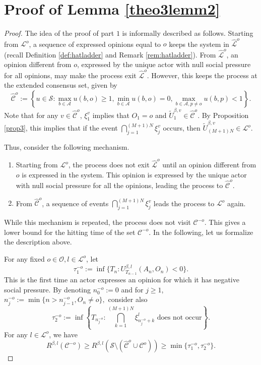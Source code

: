 \documentclass[11pt]{article}
\theoremstyle{definition}
\newcommand{\A}{\mathcal{A}}
\begin{document}
\section{Proof of Lemma \ref{theo3lemm2}}\label{appendixB}

\begin{proof} 
The idea of the proof of part $1$ is informally described as follows. Starting from $\mathcal{L}^o$, a sequence of expressed opinions equal to $o$ keeps the system in $\hat{\mathcal{L}}^o$ (recall Definition \ref{def:hatladder} and Remark \ref{rem:hatladder}). From $\hat{\mathcal{L}}^o$, an opinion different from $o$, expressed by the unique actor with null social pressure for all opinions, may make the process exit $\hat{\mathcal{L}}^o$. However, this keeps the process at the extended consensus set, given by
$$
\hat{\mathcal{C}}^{o}:=\left\{u\in\mathcal{S}: \max_{b\in \A}u(b,o)\geq 1, \min_{b\in \A}u(b,o)= 0,\max_{b\in \A, p\neq o}u(b,p)<1\right\}.
$$
Note that for any $v\in \hat{\mathcal{C}}^{o}$, $\xi_1^{v}$ implies that $O_1=o$ and $\tilde{U}_{1}^{\beta,v}\in \hat{\mathcal{C}}^{o}$. By Proposition \ref{prop3}, this implies that if the event $\bigcap^{(M+1)N}_{j=1}\xi_j^{v}$ occurs, then $\tilde{U}^{\beta,v}_{(M+1)N}\in\mathcal{L}^o$. 

Thus, consider the following mechanism.
\begin{enumerate}
    \item Starting from $\mathcal{L}^o$, the process does not exit $\hat{\mathcal{L}}^o$ until an opinion different from $o$ is expressed in the system. This opinion is expressed by the unique actor with null social pressure for all the opinions, leading the process to $\hat{\mathcal{C}}^{o}$.
    \item From $\hat{\mathcal{C}}^{o}$, a sequence of events $\bigcap^{(M+1)N}_{j=1}\xi_j^{v}$ leads the process to $\mathcal{L}^{o}$ again.
\end{enumerate}
While this mechanism is repeated, the process does not visit $\mathcal{C}^{-o}$. This gives a lower bound for the hitting time of the set $\mathcal{C}^{-o}$. In the following, let us formalize the description above.

For any fixed $o\in\mathcal{O},l \in\mathcal{L}^o$, let
    $$
        \tau^{-o}_1:=\inf\{T_n:U^{\beta,l}_{T_{n-1}}(A_n,O_n)<0\}.
    $$
    This is the first time an actor expresses an opinion for which it has negative social pressure. By denoting $n^{-o}_0:=0$ and for $j\geq1$, $n^{-o}_j:=\min\{n>n^{-o}_{j-1}, O_n\neq o\},$ consider also 
    $$
    \tau^{-o}_2:=\inf\left\{T_{n_j^{-o}}:\bigcap_{k=1}^{(M+1)N}\xi_{n_{j}^{-o}+k}^{l} \text{ does not occur}\right\}.
    $$
    For any $l\in \mathcal{L}^o$, we have
    $$
        R^{\beta,l}(\mathcal{C}^{-o})\geq R^{\beta,l}(\mathcal{S}\setminus(\hat{\mathcal{C}}^o\cup \mathcal{C}^o))\geq \min\{\tau^{-o}_1,\tau^{-o}_2\}.
    $$


\end{proof}
\end{document}
